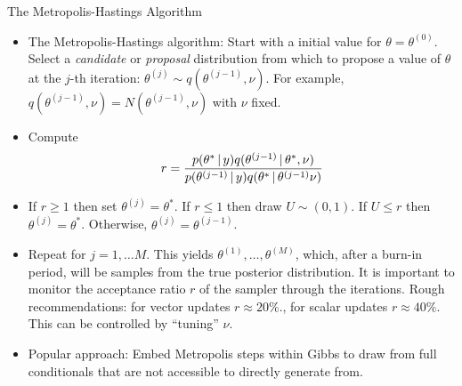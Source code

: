 {\footnotesize
\begin{frame}{The Metropolis-Hastings Algorithm}

 \begin{itemize}\setlength{\itemsep}{0.cm}
  \item The Metropolis-Hastings algorithm: Start with a initial value for $\theta=\theta^{(0)}$. Select a \emph{candidate} or \emph{proposal} distribution from which to propose a value of $\theta$ at the $j$-th iteration: $\theta^{(j)} \sim q(\theta^{(j-1)}, \nu)$. For example, $q(\theta^{(j-1)},\nu)=N(\theta^{(j-1)},\nu)$ with $\nu$ fixed.

\item Compute
\[
r =
\frac{p(\theta^{\ast}\,|\, y)q(\theta^{(j-1)}\,|\,\theta^{\ast},\nu)}{p(\theta^{(j-1)}\,|\, y)q(\theta^{\ast}\,|\,\theta^{(j-1)}\nu)}
\]

\item If $r \geq 1$ then set $\theta^{(j)}=\theta^{\ast}$. If $r \leq 1$ then draw $U\sim(0,1)$. If $U \leq r$ then
$\theta^{(j)}=\theta^{\ast}$. Otherwise, $\theta^{(j)}=\theta^{(j-1)}$.

\item Repeat for $j=1,\ldots M$. This yields $\theta^{(1)},\ldots,\theta^{(M)}$, which, after a burn-in period, will be samples from the true posterior distribution. It is important to monitor the acceptance ratio $r$ of the sampler through the iterations. Rough recommendations: for vector updates $r\approx 20\%$., for scalar updates $r\approx 40\%$. This can be controlled by ``tuning'' $\nu$.

\item Popular approach: Embed Metropolis steps within Gibbs to draw from full conditionals that are not accessible to directly generate from. 

\end{itemize}

\end{frame}
}

